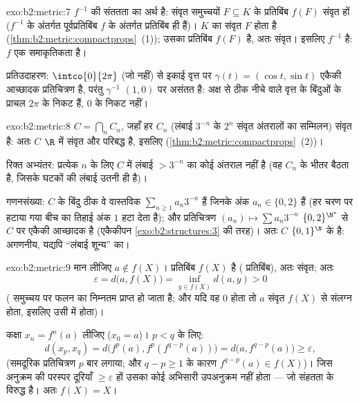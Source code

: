 \begin{solution}{exo:b2:metric:7}
$f^{-1}$ की संततता का अर्थ है: संवृत समुच्चयों $F
\subseteq K$ के प्रतिबिंब $f(F)$ संवृत
हों ($f^{-1}$ के अंतर्गत पूर्वप्रतिबिंब $f$ के अंतर्गत प्रतिबिंब ही हैं)।
 $K$ का संवृत $F$  होता है (\cref{thm:b2:metric:compactprops}~(1)); उसका  प्रतिबिंब $f(F)$
 है, अतः संवृत। इसलिए $f^{-1}$  है: $f$ एक समाकृतिकता है।

प्रतिउदाहरण: $\intco{0}{2\pi}$ (जो  नहीं) से इकाई वृत्त पर $\gamma(t) = (\cos t, \sin t)$  एकैकी आच्छादक
प्रतिचित्रण है, परंतु $\gamma^{-1}$ $(1,0)$ पर असंतत है: अक्ष से ठीक नीचे वाले वृत्त
के बिंदुओं के प्राचल $2\pi$ के निकट हैं, $0$ के निकट नहीं।
\end{solution}

\begin{solution}{exo:b2:metric:8}
$C = \bigcap_n C_n$, जहाँ हर $C_n$ (लंबाई $3^{-n}$ के $2^n$ संवृत अंतरालों का सम्मिलन) संवृत है:
अतः $C$ $\R$ में संवृत और परिबद्ध है, इसलिए  (\cref{thm:b2:metric:compactprops}~(2))।

रिक्त अभ्यंतर: प्रत्येक $n$ के लिए $C$ में लंबाई $> 3^{-n}$ का कोई अंतराल नहीं
है (वह $C_n$ के भीतर बैठता है, जिसके घटकों की लंबाई उतनी ही है)।

गणनसंख्या: $C$ के बिंदु ठीक वे वास्तविक $\sum_{n\geq1}
a_n 3^{-n}$ हैं जिनके अंक $a_n \in \{0, 2\}$ हैं (हर
चरण पर हटाया गया बीच का तिहाई अंक $1$ हटा देता है); और प्रतिचित्रण $(a_n) \mapsto
\sum a_n 3^{-n}$
$\{0,2\}^{\N^*}$ से $C$ पर एकैकी आच्छादक है (एकैकीपन \cref{exo:b2:structures:3} की तरह)। अतः $C$ $\{0,1\}^{\N}$ के
 है: अगणनीय, यद्यपि ``लंबाई शून्य'' का।
\end{solution}

\begin{solution}{exo:b2:metric:9}
मान लीजिए $a \notin f(X)$। प्रतिबिंब $f(X)$  है ( प्रतिबिंब), अतः संवृत; अतः
\[
\varepsilon = d\bigl(a, f(X)\bigr)
= \inf_{y \in f(X)} d(a, y) > 0
\]
( समुच्चय पर  फलन का निम्नतम प्राप्त हो जाता है; और यदि वह $0$
होता तो $a$ संवृत $f(X)$ से संलग्न होता, इसलिए उसी में होता)।

कक्षा $x_n = f^n(a)$ लीजिए ($x_0 = a$)। $p < q$ के लिए:
\[
d(x_p, x_q) = d\bigl(f^p(a), f^p(f^{q-p}(a))\bigr)
= d\bigl(a, f^{q-p}(a)\bigr) \geq \varepsilon,
\]
(समदूरिक प्रतिचित्रण $p$ बार लगाया; और $q - p
\geq 1$ के कारण $f^{q-p}(a) \in f(X)$)। जिस अनुक्रम
की परस्पर दूरियाँ $\geq \varepsilon$ हों उसका कोई अभिसारी उपअनुक्रम नहीं होता --- जो
संहतता के विरुद्ध है। अतः $f(X) =
X$।
\end{solution}

